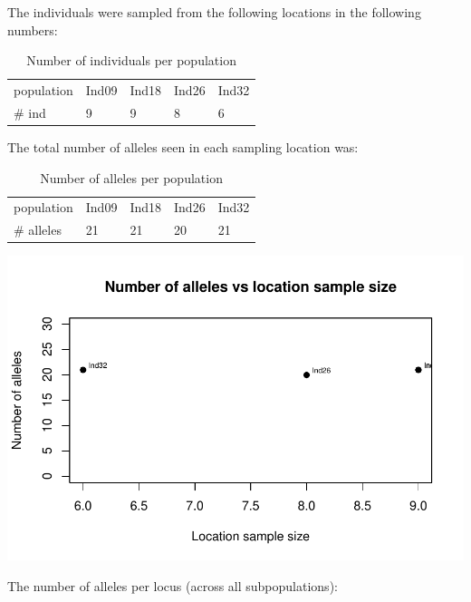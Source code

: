 \documentclass[a4paper]{scrartcl}\usepackage[]{graphicx}\usepackage[]{color}
\makeatletter
\def\maxwidth{ %
  \ifdim\Gin@nat@width>\linewidth
    \linewidth
  \else
    \Gin@nat@width
  \fi
}
\newenvironment{knitrout}{}{} %
\makeatother
\begin{document}
\noindent 
\newline The individuals were sampled from the following locations in the following numbers: 


\begin{table}[ht]
\centering
\begin{tabular}{lllll}
   \hline
population & Ind09 & Ind18 & Ind26 & Ind32 \\ 
   \rowcolor[gray]{0.9} \# ind & 9 & 9 & 8 & 6 \\ 
   \hline
\end{tabular}
\caption{Number of individuals per population} 
\end{table}


\noindent
{} 
\newline The total number of alleles seen in each sampling location was:



\begin{table}[ht]
\centering
\begin{tabular}{lllll}
   \hline
population & Ind09 & Ind18 & Ind26 & Ind32 \\ 
   \rowcolor[gray]{0.9} \# alleles & 21 & 21 & 20 & 21 \\ 
   \hline
\end{tabular}
\caption{Number of alleles per population} 
\end{table}

\begin{knitrout}
\color{fgcolor}
\includegraphics[width=\maxwidth]{PopGenReport-pop_sampsz_vs_alleles-1} 

\end{knitrout}
\FloatBarrier
\noindent
\newline The number of alleles per locus (across all subpopulations):
\end{document}
